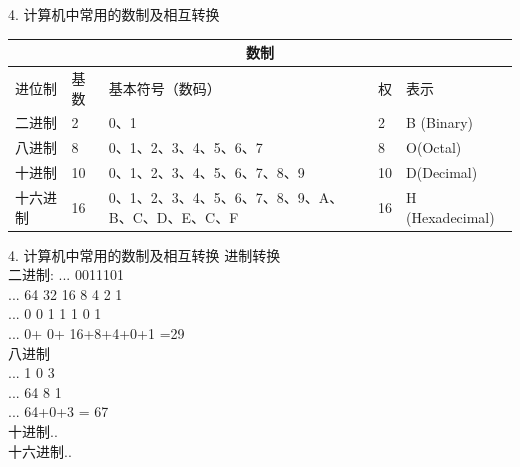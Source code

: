 \documentclass[aspectratio=169]{beamer}
\begin{document}
\begin{frame}[t]{4. 计算机中常用的数制及相互转换} \vspace{20pt}

    \begin{tabular}{ |p{2cm}|p{1cm}|p{5cm}|p{1cm}|p{3cm}|  }
        \hline
        \multicolumn{5}{|c|}{数制} \\
        \hline
        进位制  & 基数 & 基本符号（数码）& 权 & 表示\\
        \hline
        二进制  & 2    &     0、1 &                                               2  & B (Binary)\\
        八进制  & 8    &     0、1、2、3、4、5、6、7 &                             8  & O(Octal)\\
        十进制  & 10   &     0、1、2、3、4、5、6、7、8、9 &                       10 & D(Decimal)\\
        十六进制& 16   &     0、1、2、3、4、5、6、7、8、9、A、B、C、D、E、C、F &  16 & H (Hexadecimal)\\
        \hline
    \end{tabular}




\end{frame}


\begin{frame}[t]{4. 计算机中常用的数制及相互转换} \vspace{20pt}
    进制转换\\

二进制:
... 0011101\\
... 64 32 16 8 4 2 1 \\
... 0  0  1  1 1 0 1\\
... 0+ 0+ 16+8+4+0+1 =29 \\

八进制  \\
... 1  0  3\\
... 64 8 1 \\
... 64+0+3 = 67 \\

十进制..  \\
十六进制..\\


\end{frame}
\end{document}
